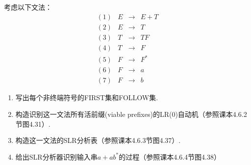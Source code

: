 \begin{example}
考虑以下文法：
\[\begin{array}{rrll}
(1) & E &\to & E+T\\
(2) & E &\to & T\\
(3) & T &\to & TF\\
(4) & T &\to & F\\
(5) & F &\to & F^*\\
(6) & F &\to & a\\
(7) & F &\to & b
\end{array}\]
\begin{enumerate}
	\item 写出每个非终端符号的FIRST集和FOLLOW集.
	\item 构造识别这一文法所有活前缀(viable prefixes)的LR(0)自动机（参照课本4.6.2节图4.31）.
	\item 构造这一文法的SLR分析表（参照课本4.6.3节图4.37）.
	\item 给出SLR分析器识别输入串$a+ab^*$的过程（参照课本4.6.4节图4.38）
\end{enumerate}
\end{example}
